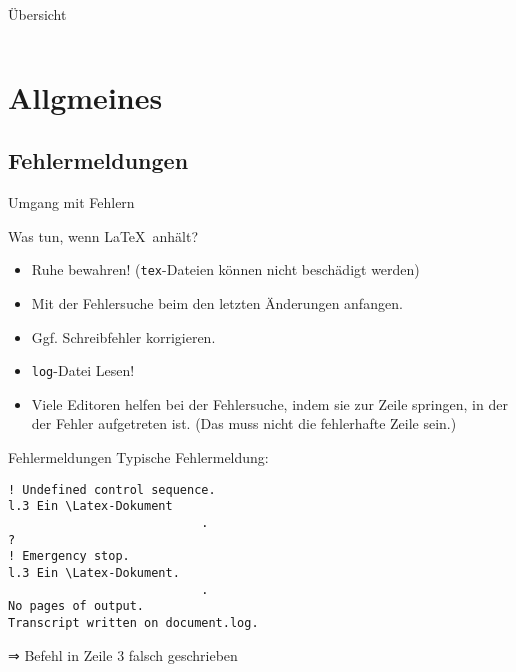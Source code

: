 \documentclass[
	vorläufig=false,
	datum=2022-11-09,
	titel={Mathematiksatz},
	web=false,
	max,
	aspectratio=1610,
]{../tex/latexkurs-slides}
\begin{document}
\begin{frame}{Übersicht}
    \begin{columns}[onlytextwidth,T]
        \begin{column}{.45\textwidth}
            \tableofcontents[sections=1-2]
        \end{column}
        \begin{column}{.45\textwidth}
            \tableofcontents[sections=3-5]
        \end{column}
    \end{columns}
\end{frame}

\section{Allgmeines}

\subsection{Fehlermeldungen}
\begin{frame}[t]{Umgang mit Fehlern}
\vfill
	\begin{block}{Was tun, wenn \LaTeX\ anhält?}
		\begin{itemize}
			\item Ruhe bewahren! (\texttt{tex}-Dateien können nicht beschädigt werden)
			\item Mit der Fehlersuche beim den letzten Änderungen anfangen.
			\item Ggf. Schreibfehler korrigieren.
			\item \texttt{log}-Datei Lesen!
			\item Viele Editoren helfen bei der Fehlersuche, indem sie zur Zeile springen, in der der Fehler aufgetreten ist. (Das muss nicht die fehlerhafte Zeile sein.)
		\end{itemize}
	\end{block}
\end{frame}

\begin{frame}[fragile,t]{Fehlermeldungen}
Typische Fehlermeldung:
\begin{lstlisting}
! Undefined control sequence.
l.3 Ein \Latex-Dokument
                           .
? 
! Emergency stop.
l.3 Ein \Latex-Dokument.
                           .
No pages of output.
Transcript written on document.log.
\end{lstlisting}
⇒ Befehl in Zeile 3 falsch geschrieben
\end{frame}
\end{document}

